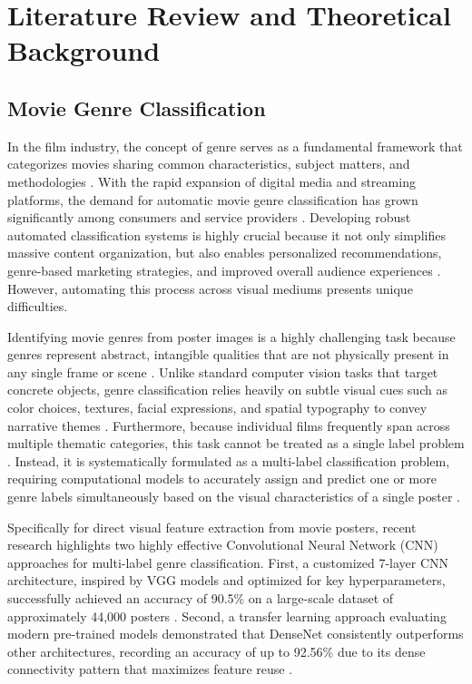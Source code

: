 \documentclass[conference]{IEEEtran}
\begin{document}
\section{Literature Review and Theoretical Background}
\label{sec:related}

\subsection{Movie Genre Classification}
In the film industry, the concept of genre serves as a fundamental framework that categorizes movies sharing common characteristics, subject matters, and methodologies \cite{b8}. With the rapid expansion of digital media and streaming platforms, the demand for automatic movie genre classification has grown significantly among consumers and service providers \cite{b6}. Developing robust automated classification systems is highly crucial because it not only simplifies massive content organization, but also enables personalized recommendations, genre-based marketing strategies, and improved overall audience experiences \cite{b8}. However, automating this process across visual mediums presents unique difficulties.  

Identifying movie genres from poster images is a highly challenging task because genres represent abstract, intangible qualities that are not physically present in any single frame or scene \cite{b8}. Unlike standard computer vision tasks that target concrete objects, genre classification relies heavily on subtle visual cues such as color choices, textures, facial expressions, and spatial typography to convey narrative themes \cite{b7}. Furthermore, because individual films frequently span across multiple thematic categories, this task cannot be treated as a single label problem \cite{b7,b8}. Instead, it is systematically formulated as a multi-label classification problem, requiring computational models to accurately assign and predict one or more genre labels simultaneously based on the visual characteristics of a single poster \cite{b7,b8}.

Specifically for direct visual feature extraction from movie posters, recent research highlights two highly effective Convolutional Neural Network (CNN) approaches for multi-label genre classification. First, a customized 7-layer CNN architecture, inspired by VGG models and optimized for key hyperparameters, successfully achieved an accuracy of 90.5\% on a large-scale dataset of approximately 44,000 posters \cite{b7}. Second, a transfer learning approach evaluating modern pre-trained models demonstrated that DenseNet consistently outperforms other architectures, recording an accuracy of up to 92.56\% due to its dense connectivity pattern that maximizes feature reuse \cite{b8}.
\end{document}

